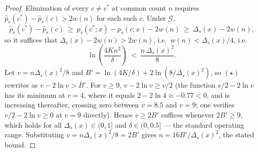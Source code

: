 \begin{proof}
Elimination of every $c \neq c^*$ at common count $n$ requires $\hat p_s(c^*) - \hat p_s(c) > 2w(n)$ for each such $c$. Under $\mathcal{G}$,
$$
\hat p_s(c^*) - \hat p_s(c) \ \geq\ p_s(c^*;x) - p_s(c;x) - 2w(n) \ \geq\ \Delta_s(x) - 2w(n),
$$
so it suffices that $\Delta_s(x) - 2w(n) > 2w(n)$, i.e.\ $w(n) < \Delta_s(x)/4$, i.e.
$$
\ln\!\left(\frac{4Kn^2}{\delta}\right) \ <\ \frac{n\,\Delta_s(x)^2}{8}. \tag{$\star$}
$$
Let $v = n\Delta_s(x)^2/8$ and $B' = \ln(4K/\delta) + 2\ln(8/\Delta_s(x)^2)$, so $(\star)$ rewrites as $v - 2\ln v > B'$. For $v \geq 9$, $v - 2\ln v \geq v/2$ (the function $v/2 - 2\ln v$ has its minimum at $v=4$, where it equals $2 - 2\ln 4 \approx -0.77 < 0$, and is increasing thereafter, crossing zero between $v=8.5$ and $v=9$; one verifies $v/2 - 2\ln v \geq 0$ at $v = 9$ directly). Hence $v \geq 2B'$ suffices whenever $2B' \geq 9$, which holds for all $\Delta_s(x) \in (0,1]$ and $\delta \in (0, 0.5]$ — the standard operating range. Substituting $v = n\Delta_s(x)^2/8 = 2B'$ gives $n = 16B'/\Delta_s(x)^2$, the stated bound.
\end{proof}

